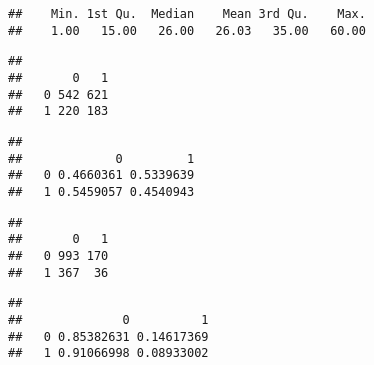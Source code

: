 \documentclass[10pt,]{book}
\newenvironment{Shaded}{\begin{snugshade}}{\end{snugshade}}
\newcommand{\DecValTok}[1]{\textcolor[rgb]{0.00,0.00,0.81}{#1}}
\newcommand{\KeywordTok}[1]{\textcolor[rgb]{0.13,0.29,0.53}{\textbf{#1}}}
\newcommand{\NormalTok}[1]{#1}
\newcommand{\OperatorTok}[1]{\textcolor[rgb]{0.81,0.36,0.00}{\textbf{#1}}}
\begin{document}
\begin{verbatim}
##    Min. 1st Qu.  Median    Mean 3rd Qu.    Max. 
##    1.00   15.00   26.00   26.03   35.00   60.00
\end{verbatim}

\begin{Shaded}
\end{Shaded}

\begin{verbatim}
##    
##       0   1
##   0 542 621
##   1 220 183
\end{verbatim}

\begin{Shaded}
\end{Shaded}

\begin{verbatim}
##    
##             0         1
##   0 0.4660361 0.5339639
##   1 0.5459057 0.4540943
\end{verbatim}

\begin{Shaded}
\end{Shaded}

\begin{verbatim}
##    
##       0   1
##   0 993 170
##   1 367  36
\end{verbatim}

\begin{Shaded}
\end{Shaded}

\begin{verbatim}
##    
##              0          1
##   0 0.85382631 0.14617369
##   1 0.91066998 0.08933002
\end{verbatim}
\end{document}
